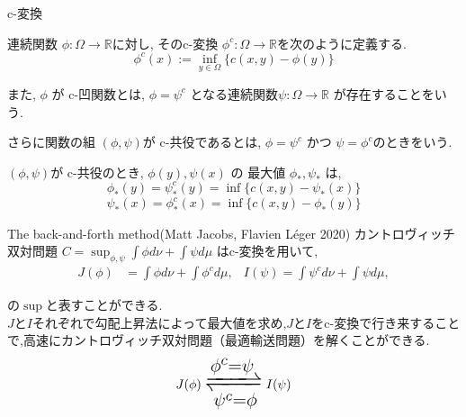 \documentclass[aspectratio=169, dvipdfmx, 12pt]{beamer}
\begin{document}
\begin{frame}{c-変換}
    \begin{definition}[c-変換]

        連続関数 $\phi: \Omega \to \mathbb{R}$に対し, そのc-変換 $\phi^c: \Omega \to \mathbb{R}$を次のように定義する.
        \begin{equation*}
            \phi^c(x) := \inf_{y \in \Omega} \{ c(x, y) - \phi(y) \}
        \end{equation*}

        また, $\phi$ が c-凹関数とは, $\phi = \psi^c$ となる連続関数$\psi: \Omega \to \mathbb{R}$ が存在することをいう.

        さらに関数の組 $(\phi, \psi)$が c-共役であるとは, $\phi = \psi^c$ かつ $\psi = \phi^c$のときをいう.

    \end{definition}
    $(\phi, \psi)$が c-共役のとき, $\phi (y), \psi (x)$ の 最大値 $\phi_*, \psi_*$  は,
    \begin{equation*}
        \phi_*(y) = \psi_*^c(y) = \inf\{c(x, y) - \psi_*(x) \}
    \end{equation*}
    \begin{equation*}
        \psi_*(x) = \phi_*^c(x) = \inf\{c(x, y) - \phi_*(y) \}
    \end{equation*}
\end{frame}



\begin{frame}{The back-and-forth method(Matt Jacobs, Flavien Léger 2020)}
    カントロヴィッチ双対問題
    $C = \sup_{\phi, \psi} \int \phi  d\nu + \int \psi  d\mu $
    はc-変換を用いて,
    \begin{align*}
        J(\phi) &= \int \phi  d \nu + \int \phi^c  d \mu, &
        I(\psi) = \int \psi^c  d \nu + \int \psi  d \mu, 
    \end{align*}

    の$\sup$と表すことができる.\\
    \vspace{\baselineskip}
    $J$と$I$それぞれで勾配上昇法によって最大値を求め,$J$と$I$をc-変換で行き来することで,高速にカントロヴィッチ双対問題（最適輸送問題）を解くことができる.\\
    
    \begin{equation*}
        \huge J(\phi) \xrightleftharpoons[\psi^c = \phi]{\phi^c = \psi} I(\psi)
    \end{equation*}
    


\end{frame}
\end{document}

